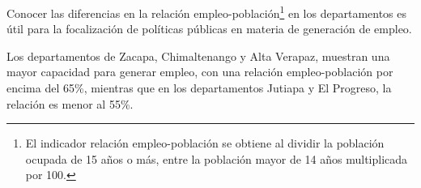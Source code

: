 Conocer las diferencias en la relación empleo-población\footnote{El indicador relación empleo-población se obtiene al dividir la población ocupada de 15 años o más,  entre la población mayor de 14 años multiplicada por 100.} en los departamentos es útil para la focalización de políticas públicas en materia de generación de empleo. 

 Los departamentos de Zacapa, Chimaltenango y Alta Verapaz, muestran una mayor capacidad para generar empleo, con una relación empleo-población por encima del 65\%, mientras que en los departamentos Jutiapa y El Progreso, la relación es menor al 55\%.
